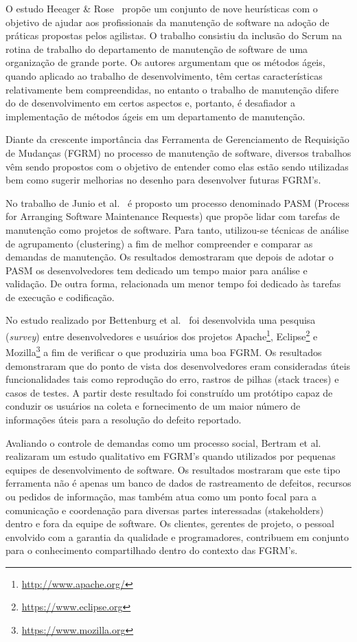 O estudo Heeager \& Rose~\cite{Heeager2015} propõe um conjunto de nove heurísticas com o objetivo de ajudar aos profissionais da manutenção de software na adoção de práticas propostas pelos agilistas. O trabalho consistiu da inclusão do Scrum na rotina de trabalho do departamento de manutenção de software de uma organização de grande porte. Os autores argumentam que os métodos ágeis, quando aplicado ao trabalho de desenvolvimento, têm certas características relativamente bem compreendidas, no entanto o trabalho de manutenção difere do de desenvolvimento em certos aspectos e, portanto, é desafiador a implementação de métodos ágeis em um departamento de manutenção.

Diante da crescente importância das Ferramenta de Gerenciamento de Requisição de Mudanças (FGRM) no processo de manutenção de software, diversos trabalhos vêm sendo propostos com o objetivo de entender como elas estão sendo utilizadas bem como sugerir melhorias no desenho para desenvolver futuras FGRM's.

No trabalho de Junio et al.~\cite{5741246} é proposto um processo denominado PASM (Process for Arranging
Software Maintenance Requests) que propõe lidar com tarefas de manutenção como projetos de software. Para tanto, utilizou-se técnicas de análise de agrupamento (clustering) a fim de melhor compreender e comparar as demandas de manutenção. Os resultados demostraram que depois de adotar o PASM os
desenvolvedores tem dedicado um tempo maior para análise e validação. De outra forma, relacionada um menor tempo foi dedicado às tarefas de execução e codificação.

No estudo realizado por Bettenburg et al.~\cite{bettenburg2008makes} foi
desenvolvida uma pesquisa (\textit{survey}) entre desenvolvedores e usuários dos
projetos Apache\footnote{\url{http://www.apache.org/}}, Eclipse\footnote{\url{https://www.eclipse.org}} e Mozilla\footnote{\url{https://www.mozilla.org}} a fim de verificar o que
produziria uma boa FGRM\@. Os resultados demonstraram que do ponto de vista dos desenvolvedores eram consideradas úteis funcionalidades tais como reprodução do erro, rastros de pilhas (stack traces) e casos de testes. A partir deste resultado foi construído um protótipo capaz de conduzir os usuários na coleta e fornecimento de um maior número de informações úteis para a resolução do defeito reportado.

Avaliando o controle de demandas como um processo social, Bertram et
al.~\cite{Bertram:2010:CCB:1718918.1718972} realizaram um estudo qualitativo em
FGRM's quando utilizados por pequenas equipes de desenvolvimento de software. Os resultados mostraram que este tipo ferramenta não é apenas um banco de dados de rastreamento de defeitos, recursos ou pedidos de informação, mas também atua como um ponto focal para a comunicação e coordenação para diversas partes interessadas (stakeholders) dentro e fora da equipe de software. Os
clientes, gerentes de projeto, o pessoal envolvido com a garantia da qualidade
e programadores, contribuem em conjunto para o conhecimento compartilhado dentro do contexto das FGRM's.

